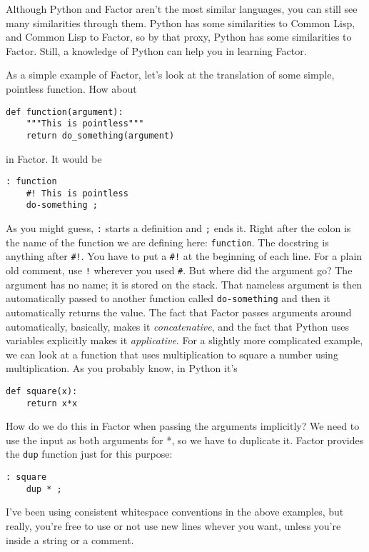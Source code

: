 \documentclass{article}
\begin{document}
Although Python and Factor aren't the most similar languages, you can still see many similarities through them. Python has some similarities to Common Lisp, and Common Lisp to Factor, so by that proxy, Python has some similarities to Factor. Still, a knowledge of Python can help you in learning Factor.

As a simple example of Factor, let's look at the translation of some simple, pointless function. How about
\begin{verbatim}
def function(argument):
    """This is pointless"""
    return do_something(argument)
\end{verbatim}
in Factor. It would be
\begin{verbatim}
: function
    #! This is pointless
    do-something ;
\end{verbatim}
As you might guess, \texttt{:} starts a definition and \texttt{;} ends it. Right after the colon is the name of the function we are defining here: \texttt{function}. The docstring is anything after \verb|#!|. You have to put a \verb|#!| at the beginning of each line. For a plain old comment, use \texttt{!} wherever you used \verb|#|. But where did the argument go? The argument has no name; it is stored on the stack. That nameless argument is then automatically passed to another function called \texttt{do-something} and then it automatically returns the value. The fact that Factor passes arguments around automatically, basically, makes it \emph{concatenative}, and the fact that Python uses variables explicitly makes it \emph{applicative}. For a slightly more complicated example, we can look at a function that uses multiplication to square a number using multiplication. As you probably know, in Python it's
\begin{verbatim}
def square(x):
    return x*x
\end{verbatim}
How do we do this in Factor when passing the arguments implicitly? We need to use the input as both arguments for *, so we have to duplicate it. Factor provides the \texttt{dup} function just for this purpose:
\begin{verbatim}
: square
    dup * ;
\end{verbatim}
I've been using consistent whitespace conventions in the above examples, but really, you're free to use or not use new lines whever you want, unless you're inside a string or a comment.
\end{document}
